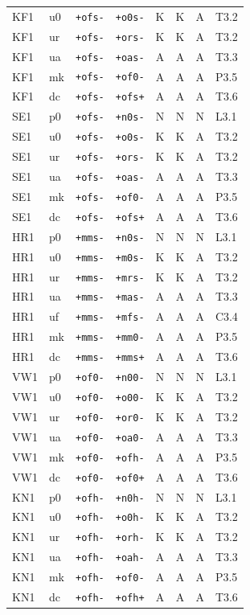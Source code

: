 {\begin{longtable}{@{}llllcccl@{}}
KF1 & u0 & \texttt{+ofs-} & \texttt{+o0s-} & K & K & A & T3.2 \\
KF1 & ur & \texttt{+ofs-} & \texttt{+ors-} & K & K & A & T3.2 \\
KF1 & ua & \texttt{+ofs-} & \texttt{+oas-} & A & A & A & T3.3 \\
KF1 & mk & \texttt{+ofs-} & \texttt{+of0-} & A & A & A & P3.5 \\
KF1 & dc & \texttt{+ofs-} & \texttt{+ofs+} & A & A & A & T3.6 \\
SE1 & p0 & \texttt{+ofs-} & \texttt{+n0s-} & N & N & N & L3.1 \\
SE1 & u0 & \texttt{+ofs-} & \texttt{+o0s-} & K & K & A & T3.2 \\
SE1 & ur & \texttt{+ofs-} & \texttt{+ors-} & K & K & A & T3.2 \\
SE1 & ua & \texttt{+ofs-} & \texttt{+oas-} & A & A & A & T3.3 \\
SE1 & mk & \texttt{+ofs-} & \texttt{+of0-} & A & A & A & P3.5 \\
SE1 & dc & \texttt{+ofs-} & \texttt{+ofs+} & A & A & A & T3.6 \\
HR1 & p0 & \texttt{+mms-} & \texttt{+n0s-} & N & N & N & L3.1 \\
HR1 & u0 & \texttt{+mms-} & \texttt{+m0s-} & K & K & A & T3.2 \\
HR1 & ur & \texttt{+mms-} & \texttt{+mrs-} & K & K & A & T3.2 \\
HR1 & ua & \texttt{+mms-} & \texttt{+mas-} & A & A & A & T3.3 \\
HR1 & uf & \texttt{+mms-} & \texttt{+mfs-} & A & A & A & C3.4 \\
HR1 & mk & \texttt{+mms-} & \texttt{+mm0-} & A & A & A & P3.5 \\
HR1 & dc & \texttt{+mms-} & \texttt{+mms+} & A & A & A & T3.6 \\
VW1 & p0 & \texttt{+of0-} & \texttt{+n00-} & N & N & N & L3.1 \\
VW1 & u0 & \texttt{+of0-} & \texttt{+o00-} & K & K & A & T3.2 \\
VW1 & ur & \texttt{+of0-} & \texttt{+or0-} & K & K & A & T3.2 \\
VW1 & ua & \texttt{+of0-} & \texttt{+oa0-} & A & A & A & T3.3 \\
VW1 & mk & \texttt{+of0-} & \texttt{+ofh-} & A & A & A & P3.5 \\
VW1 & dc & \texttt{+of0-} & \texttt{+of0+} & A & A & A & T3.6 \\
KN1 & p0 & \texttt{+ofh-} & \texttt{+n0h-} & N & N & N & L3.1 \\
KN1 & u0 & \texttt{+ofh-} & \texttt{+o0h-} & K & K & A & T3.2 \\
KN1 & ur & \texttt{+ofh-} & \texttt{+orh-} & K & K & A & T3.2 \\
KN1 & ua & \texttt{+ofh-} & \texttt{+oah-} & A & A & A & T3.3 \\
KN1 & mk & \texttt{+ofh-} & \texttt{+of0-} & A & A & A & P3.5 \\
KN1 & dc & \texttt{+ofh-} & \texttt{+ofh+} & A & A & A & T3.6 \\
\end{longtable}}

